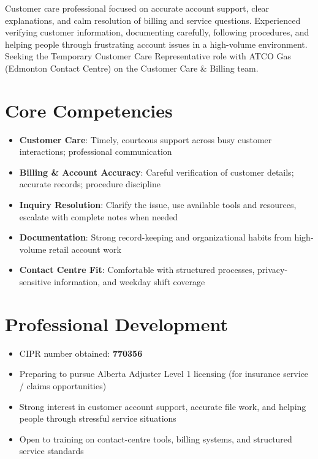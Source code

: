 \documentclass[11pt,a4paper,sans]{moderncv}
\begin{document}
\makecvtitle

\vspace{6pt}
\small{Customer care professional focused on accurate account support, clear explanations, and calm resolution of billing and service questions. Experienced verifying customer information, documenting carefully, following procedures, and helping people through frustrating account issues in a high-volume environment. Seeking the Temporary Customer Care Representative role with ATCO Gas (Edmonton Contact Centre) on the Customer Care \& Billing team.}

\section{Core Competencies}
\vspace{1pt}
\begin{itemize}
\item \textbf{Customer Care}: Timely, courteous support across busy customer interactions; professional communication
\item \textbf{Billing \& Account Accuracy}: Careful verification of customer details; accurate records; procedure discipline
\item \textbf{Inquiry Resolution}: Clarify the issue, use available tools and resources, escalate with complete notes when needed
\item \textbf{Documentation}: Strong record-keeping and organizational habits from high-volume retail account work
\item \textbf{Contact Centre Fit}: Comfortable with structured processes, privacy-sensitive information, and weekday shift coverage
\end{itemize}

\section{Professional Development}
\vspace{1pt}
\begin{itemize}
\item CIPR number obtained: \textbf{770356}
\item Preparing to pursue Alberta Adjuster Level 1 licensing (for insurance service / claims opportunities)
\item Strong interest in customer account support, accurate file work, and helping people through stressful service situations
\item Open to training on contact-centre tools, billing systems, and structured service standards
\end{itemize}
\end{document}
